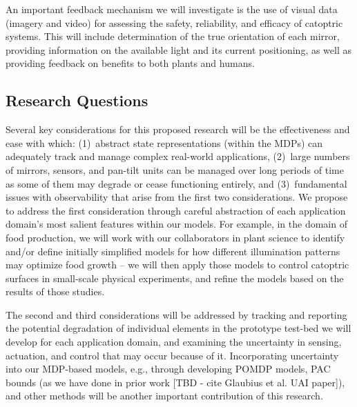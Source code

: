 An important feedback mechanism we will investigate is the use of visual
data (imagery and video) for assessing the safety, reliability, and
efficacy of catoptric systems. This will include determination of the true
orientation of each mirror, providing information on the available
light and its current positioning, as well as providing feedback on
benefits to both plants and humans.

\subsection{Research Questions}
\label{sec:rq}


Several key considerations for this proposed research will be the effectiveness
and ease with which: (1)~abstract state representations (within the MDPs) can
adequately track and manage complex real-world applications, (2)~large numbers
of mirrors, sensors, and pan-tilt units can be managed over long periods of
time as some of them may degrade or cease functioning entirely, and
(3)~fundamental issues with observability that arise from the first two
considerations.  We propose to address the first consideration through careful
abstraction of each application domain's most salient features within our
models.  For example, in the domain of food production, we will work with our
collaborators in plant science to identify and/or define initially simplified
models for how different illumination patterns may optimize food growth -- we
will then apply those models to control catoptric surfaces in small-scale
physical experiments, and refine the models based on the results of those
studies.

The second and third considerations will be addressed by tracking and reporting
the potential degradation of individual elements in the prototype test-bed we
will develop for each application domain, and examining the uncertainty in
sensing, actuation, and control that may occur because of it.  Incorporating
uncertainty into our MDP-based models, e.g., through developing POMDP models,
PAC bounds (as we have done in prior work [TBD - cite Glaubius et al. UAI
paper]), and other methods will be another important contribution of this
research.
